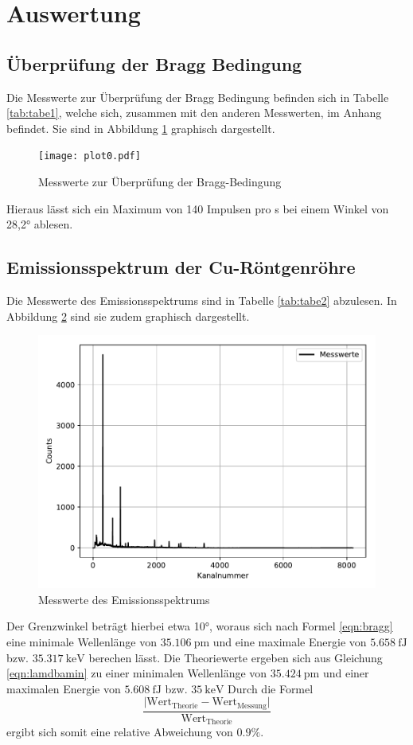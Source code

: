 \section{Auswertung}
\subsection{Überprüfung der Bragg Bedingung}
Die Messwerte zur Überprüfung der Bragg Bedingung befinden sich in Tabelle \ref{tab:tabe1},
welche sich, zusammen mit den anderen Messwerten, im Anhang befindet.
Sie sind in Abbildung \ref{fig:plot0} graphisch dargestellt.
\begin{figure}[H]
  \centering
  \texttt{[image: plot0.pdf]}
  \caption{Messwerte zur Überprüfung der Bragg-Bedingung}
  \label{fig:plot0}
\end{figure}

Hieraus lässt sich ein Maximum von 140 Impulsen pro s bei einem Winkel von 28,2°
ablesen.

\subsection{Emissionsspektrum der Cu-Röntgenröhre}
Die Messwerte des Emissionsspektrums sind in Tabelle \ref{tab:tabe2} abzulesen. In
Abbildung \ref{fig:plot1} sind sie zudem graphisch dargestellt.
\begin{figure}[H]
  \centering
  \includegraphics{plot1.pdf}
  \caption{Messwerte des Emissionsspektrums}
  \label{fig:plot1}
\end{figure}
Der Grenzwinkel beträgt hierbei etwa 10°, woraus sich nach Formel \ref{eqn:bragg} eine minimale
Wellenlänge von $ \SI{35.106}{\pico\meter}$ und eine maximale Energie von $\SI{5.658}{\femto\joule}$
bzw. $\SI{35.317}{\kilo \electronvolt}$ berechen lässt. Die Theoriewerte ergeben sich
aus Gleichung \ref{eqn:lamdbamin} zu einer minimalen Wellenlänge von $ \SI{35.424}{\pico\meter}$
und einer maximalen Energie von $\SI{5.608}{\femto\joule}$
bzw. $\SI{35}{\kilo \electronvolt}$
Durch die Formel
\begin{equation*}
  \frac{\lvert \text{Wert}_{\text{Theorie}}-\text{Wert}_{\text{Messung}}\rvert}{\text{Wert}_{\text{Theorie}}}
  \label{eqn:abw}
\end{equation*}
ergibt sich somit eine relative Abweichung von $0.9 \%$.

